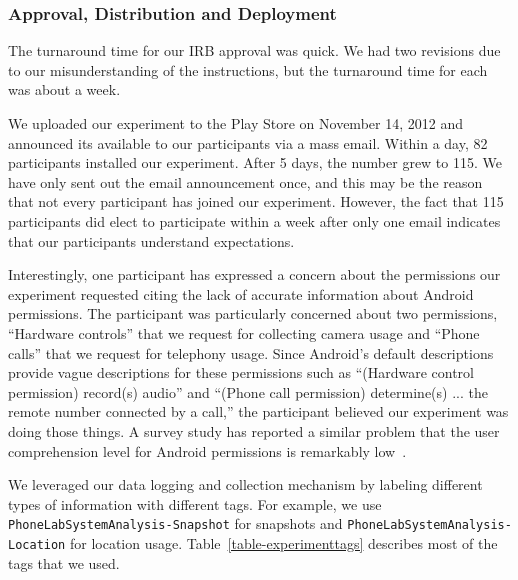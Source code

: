 \subsubsection{Approval, Distribution and Deployment}

The turnaround time for our IRB approval was quick. We had two revisions due
to our misunderstanding of the instructions, but the turnaround time for each
was about a week.

We uploaded our experiment to the Play Store on November 14, 2012 and
announced its available to our participants via a mass email. Within a day,
82 participants installed our experiment. After 5 days, the number grew to
115. We have only sent out the email announcement once, and this may be the
reason that not every participant has joined our experiment. However, the
fact that 115 participants did elect to participate within a week after only
one email indicates that our participants understand \PhoneLab{}
expectations.

Interestingly, one participant has expressed a concern about the permissions
our experiment requested citing the lack of accurate information about
Android permissions. The participant was particularly concerned about two
permissions, ``Hardware controls'' that we request for collecting camera
usage and ``Phone calls'' that we request for telephony usage. Since
Android's default descriptions provide vague descriptions for these
permissions such as ``(Hardware control permission) record(s) audio'' and
``(Phone call permission) determine(s) ... the remote number connected by a
call,'' the participant believed our experiment was doing those things. A
survey study has reported a similar problem that the user comprehension level
for Android permissions is remarkably low~\cite{felt:soups:2012}.

We leveraged our data logging and collection mechanism by labeling different
types of information with different tags. For example, we use
\texttt{PhoneLabSystemAnalysis-Snapshot} for snapshots and
\texttt{PhoneLabSystemAnalysis-Location} for location usage.
Table~\ref{table-experimenttags} describes most of the tags that we used.
